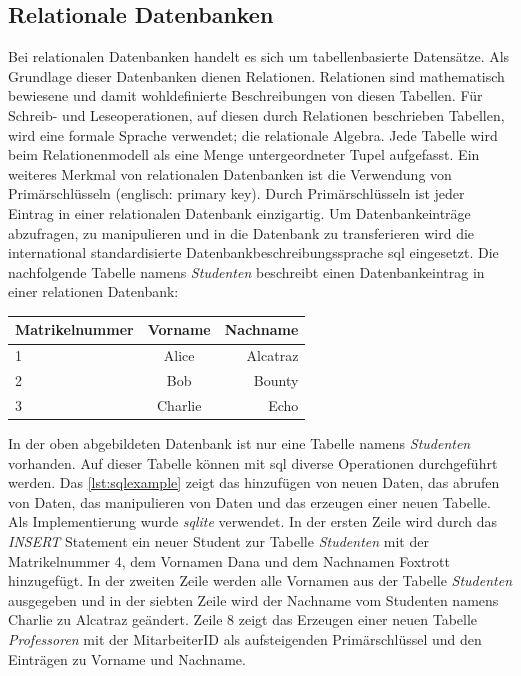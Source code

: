 \documentclass[titlepage]{report}
\begin{document}
\subsection*{Relationale Datenbanken}
Bei relationalen Datenbanken handelt es sich um tabellenbasierte
Datensätze. Als Grundlage dieser Datenbanken dienen Relationen.
Relationen sind mathematisch bewiesene und damit wohldefinierte
Beschreibungen von diesen Tabellen. Für Schreib\hyp{} und
Leseoperationen, auf diesen durch Relationen beschrieben Tabellen, wird
eine formale Sprache verwendet; die relationale Algebra. Jede Tabelle
wird beim Relationenmodell als eine Menge untergeordneter Tupel
aufgefasst\cite[S. 4]{MEIER2013}. Ein weiteres Merkmal von relationalen
Datenbanken ist die Verwendung von Primärschlüsseln (englisch: primary
key). Durch Primärschlüsseln ist jeder Eintrag in einer relationalen
Datenbank einzigartig. Um Datenbankeinträge abzufragen, zu manipulieren
und in die Datenbank zu transferieren wird die international
standardisierte Datenbankbeschreibungssprache \gls{sql} eingesetzt. Die
nachfolgende Tabelle namens \emph{Studenten} beschreibt einen
Datenbankeintrag in einer relationen Datenbank:
\begin{center}
    \begin{tabular}{l c r}
        \toprule
        Matrikelnummer & Vorname & Nachname \\
        \midrule
        1              & Alice   & Alcatraz \\
        2              & Bob     & Bounty   \\
        3              & Charlie & Echo     \\
        \bottomrule
    \end{tabular}
\end{center}
In der oben abgebildeten Datenbank ist nur eine Tabelle namens
\emph{Studenten} vorhanden. Auf dieser Tabelle können mit \gls{sql} diverse
Operationen durchgeführt werden. Das \autoref{lst:sqlexample} zeigt das hinzufügen von neuen
Daten, das abrufen von Daten, das manipulieren von Daten und das
erzeugen einer neuen Tabelle. Als Implementierung wurde \emph{sqlite}
verwendet. In der ersten Zeile wird durch das \emph{INSERT} Statement
ein neuer Student zur Tabelle \emph{Studenten} mit der Matrikelnummer 4,
dem Vornamen Dana und dem Nachnamen Foxtrott hinzugefügt. In der zweiten
Zeile werden alle Vornamen aus der Tabelle \emph{Studenten}
ausgegeben und in der siebten Zeile wird der Nachname vom Studenten
namens Charlie zu Alcatraz geändert. Zeile 8 zeigt das Erzeugen einer
neuen Tabelle \emph{Professoren} mit der MitarbeiterID als
aufsteigenden Primärschlüssel und den Einträgen zu Vorname und Nachname.
\end{document}

